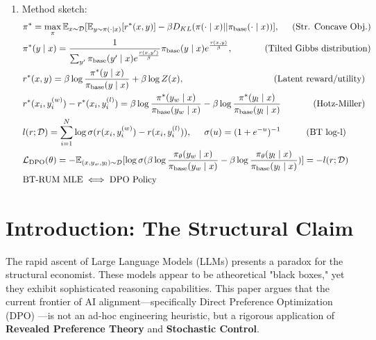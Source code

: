 \documentclass[11pt]{article}
\theoremstyle{plain}
\theoremstyle{definition}
\theoremstyle{remark}
\newcommand{\1}{\mathbf{1}}
\begin{document}
\begin{enumerate}
    \item Method sketch: 
        \begin{align}
            &\pi^* = \max_{\pi} \mathbb{E}_{x \sim \mathcal{D}} [\mathbb{E}_{y \sim \pi(\cdot \mid x)} [r^*(x,y)] - \beta D_{KL} (\pi(\cdot \mid x) || \pi_{\text{base}}(\cdot \mid x))], \hspace{0.5cm} \text{(Str. Concave Obj.)}
            \\
            &\pi^*(y \mid x) = \frac{1}{\sum_{y'} \pi_{\text{base}}(y' \mid x) e^{\frac{r(x,y')}{\beta}}} \pi_{\text{base}}(y \mid x) e^{\frac{r(x,y)}{\beta}}, \hspace{1.25cm} \text{(Tilted Gibbs distribution)}  
            \\
            &r^*(x,y) = \beta \log \frac{\pi^*(y \mid x)}{\pi_{\text{base}}(y \mid x)} + \beta \log Z(x), \hspace{3.5cm} \text{(Latent reward/utility)}
            \\
            &r^*(x_i, y_i^{(w)}) - r^*(x_i, y_i^{(l)}) = \beta \log \frac{\pi^*(y_w \mid x)}{\pi_{\text{base}}(y_w \mid x)} - \beta \log \frac{\pi^*(y_l \mid x)}{\pi_{\text{base}}(y_l \mid x)} \hspace{1.25cm} \text{(Hotz-Miller)} 
            \\
            &l(r; \mathcal{D}) = \sum_{i=1}^N \log \sigma (r(x_i, y_i^{(w)}) - r(x_i, y_i^{(l)})), \hspace{0.5cm} \sigma(u) = (1 + e^{-u})^{-1} \hspace{1cm} \text{(BT log-l)}
            \\
            &\mathcal{L}_{\text{DPO}}(\theta) = - \mathbb{E}_{(x, y_w, y_l) \sim \mathcal{D}} [\log \sigma (\beta \log \frac{\pi_\theta(y_w \mid x)}{\pi_{\text{base}}(y_w \mid x)} - \beta \log \frac{\pi_\theta(y_l \mid x)}{\pi_{\text{base}}(y_l \mid x)})] = -l(r; \mathcal{D}) \\
            &\text{BT-RUM MLE} \iff \text{DPO Policy}
        \end{align}
\end{enumerate}

\clearpage

\section{Introduction: The Structural Claim}\label{sec:claim}

The rapid ascent of Large Language Models (LLMs) presents a paradox for the structural economist. These models appear to be atheoretical "black boxes," yet they exhibit sophisticated reasoning capabilities. This paper argues that the current frontier of AI alignment—specifically Direct Preference Optimization (DPO) \cite{rafailov2023dpo} —is not an ad-hoc engineering heuristic, but a rigorous application of \textbf{Revealed Preference Theory} and \textbf{Stochastic Control}.
\end{document}
